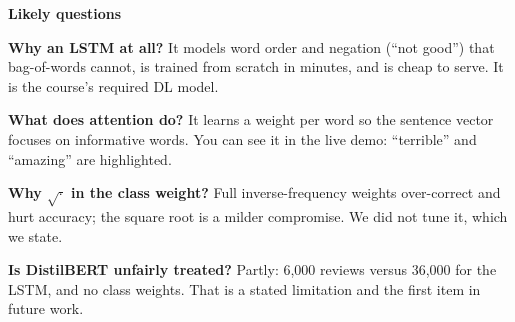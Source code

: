 \documentclass[10pt,a4paper]{article}
\begin{document}
\par\vspace{2pt}\textbf{Likely questions}\par\vspace{1pt}
\begin{qa}\textbf{Why an LSTM at all?} It models word order and negation (``not good'') that bag-of-words cannot, is trained from scratch in minutes, and is cheap to serve. It is the course's required DL model.\end{qa}\vspace{2pt}
\begin{qa}\textbf{What does attention do?} It learns a weight per word so the sentence vector focuses on informative words. You can see it in the live demo: ``terrible'' and ``amazing'' are highlighted.\end{qa}\vspace{2pt}
\begin{qa}\textbf{Why $\sqrt{\cdot}$ in the class weight?} Full inverse-frequency weights over-correct and hurt accuracy; the square root is a milder compromise. We did not tune it, which we state.\end{qa}\vspace{2pt}
\begin{qa}\textbf{Is DistilBERT unfairly treated?} Partly: 6,000 reviews versus 36,000 for the LSTM, and no class weights. That is a stated limitation and the first item in future work.\end{qa}
\newpage
\end{document}
